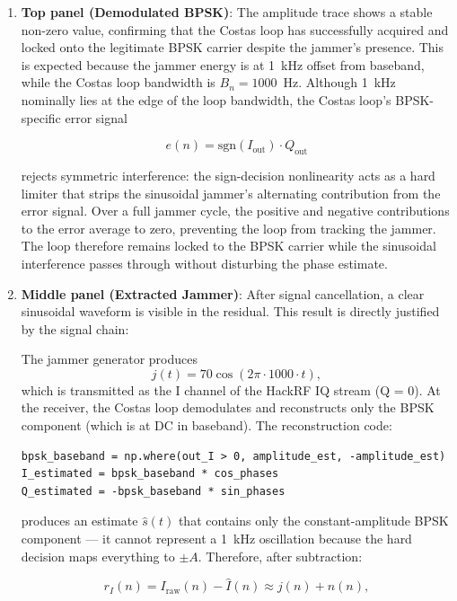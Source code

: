 \documentclass{article}
\begin{document}
\begin{enumerate}
\item \textbf{Top panel (Demodulated BPSK)}: The amplitude trace shows a stable non-zero value, confirming that the Costas loop has successfully acquired and locked onto the legitimate BPSK carrier despite the jammer's presence. This is expected because the jammer energy is at 1~kHz offset from baseband, while the Costas loop bandwidth is $B_n = 1000$~Hz. Although 1~kHz nominally lies at the edge of the loop bandwidth, the Costas loop's BPSK-specific error signal

\begin{equation}
e(n) = \text{sgn}(I_{\text{out}}) \cdot Q_{\text{out}}
\end{equation}

rejects symmetric interference: the sign-decision nonlinearity acts as a hard limiter that strips the sinusoidal jammer's alternating contribution from the error signal. Over a full jammer cycle, the positive and negative contributions to the error average to zero, preventing the loop from tracking the jammer. The loop therefore remains locked to the BPSK carrier while the sinusoidal interference passes through without disturbing the phase estimate.

\item \textbf{Middle panel (Extracted Jammer)}: After signal cancellation, a clear sinusoidal waveform is visible in the residual. This result is directly justified by the signal chain:

The jammer generator produces
\begin{equation}
j(t) = 70 \cos(2\pi \cdot 1000 \cdot t),
\end{equation}
which is transmitted as the I channel of the HackRF IQ stream (Q = 0). At the receiver, the Costas loop demodulates and reconstructs only the BPSK component (which is at DC in baseband). The reconstruction code:

\begin{verbatim}
bpsk_baseband = np.where(out_I > 0, amplitude_est, -amplitude_est)
I_estimated = bpsk_baseband * cos_phases
Q_estimated = -bpsk_baseband * sin_phases
\end{verbatim}

produces an estimate $\hat{s}(t)$ that contains only the constant-amplitude BPSK component — it cannot represent a 1~kHz oscillation because the hard decision maps everything to $\pm A$. Therefore, after subtraction:

\begin{equation}
r_I(n) = I_{\text{raw}}(n) - \hat{I}(n) \approx j(n) + n(n),
\end{equation}


\end{enumerate}
\end{document}
